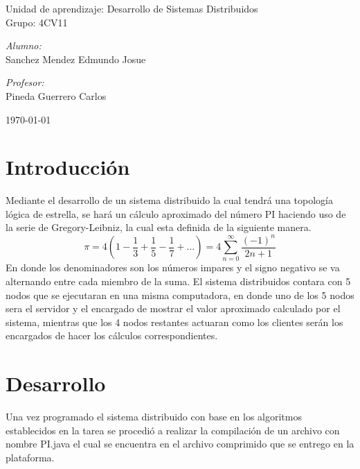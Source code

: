 \documentclass[11pt]{article}
\begin{document}
\begin{titlepage}
\begin{center}
				{ \Large Unidad de aprendizaje: Desarrollo de Sistemas Distribuidos} \\[1cm]
				
				{ \Large Grupo: 4CV11 } \\[1cm]
				
				\noindent
				\begin{minipage}{0.5\textwidth}
					\begin{flushleft} \large
						\emph{Alumno:} \\
						Sanchez Mendez Edmundo Josue
					\end{flushleft}
				\end{minipage}%
				\begin{minipage}{0.5\textwidth}
					\begin{flushright} \large
						\emph{Profesor:} \\
						Pineda Guerrero Carlos 
					\end{flushright}
				\end{minipage}
				
				\vfill
				{\large {\today}}
			\end{center}
		\end{titlepage}
	
	\titlepage
	\tableofcontents
	\newpage
	
	\section{Introducción}
		Mediante el desarrollo de un sistema distribuido la cual tendrá una topología lógica de estrella, se hará un cálculo aproximado del número PI haciendo uso de la serie de Gregory-Leibniz, la cual esta definida de la siguiente manera.
		 \[ \pi
  = 4(1 -
  \dfrac{1}{3} + 
  \dfrac{1}{5} - 
  \dfrac{1}{7} + ...) = 4 \sum_{n=0}^{\infty}\dfrac{(-1)^{n}}{2n+1} 
\]
	En donde los denominadores son los números impares y el signo negativo se va alternando entre cada miembro de la suma. El sistema distribuidos contara con 5 nodos que se ejecutaran en una misma computadora, en donde uno de los 5 nodos sera el servidor y el encargado de mostrar el valor aproximado calculado por el sistema, mientras que los 4 nodos restantes actuaran como los clientes serán los encargados de hacer los cálculos correspondientes.
	\section{Desarrollo}
Una vez programado el sistema distribuido con base en los algoritmos establecidos en la tarea se procedió a realizar la compilación de un archivo con nombre PI.java el cual se encuentra en el archivo comprimido que se entrego en la plataforma.
\end{document}

